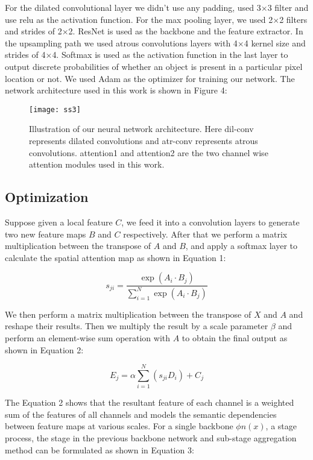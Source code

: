 \documentclass{article}
\begin{document}
For the dilated convolutional layer we didn’t use any padding, used 3$\times$3 filter and use relu as the activation function. For the max pooling layer, we used 2$\times$2 filters and strides of 2$\times$2. ResNet is used as the backbone and the feature extractor. In the upsampling path we used atrous convolutions layers with 4$\times$4 kernel size and strides of 4$\times$4. Softmax is used as the activation function in the last layer to output discrete probabilities of whether an object is present in a particular pixel location or not. We used Adam as the optimizer for training our network. The network architecture used in this work is shown in Figure 4:

\begin{figure}[htp]
    \centering
    \texttt{[image: ss3]}
    \caption{Illustration of our neural network architecture. Here dil-conv represents dilated convolutions and atr-conv represents atrous convolutions. attention1 and attention2 are the two channel wise attention modules used in this work.}
    \label{fig3}
\end{figure}

\subsection{Optimization}

Suppose given a local feature $C$, we feed it into a convolution layers to generate two new feature maps $B$ and $C$ respectively. After that we perform a matrix multiplication between the transpose of $A$ and $B$, and apply a softmax layer to calculate the spatial attention map as shown in Equation 1:

\begin{equation}
s_{j i}=\frac{\exp \left(A_{i} \cdot B_{j}\right)}{\sum_{i=1}^{N} \exp \left(A_{i} \cdot B_{j}\right)}    
\end{equation}

We then perform a matrix multiplication
between the transpose of $X$ and $A$ and reshape their results. Then we multiply the result by a scale parameter $\beta$ and perform an element-wise sum operation with
$A$ to obtain the final output as shown in Equation 2:

\begin{equation}
E_{j}=\alpha \sum_{i=1}^{N}\left(s_{j i} D_{i}\right)+C_{j} 
\end{equation}

The Equation 2 shows that the resultant feature of each channel is a weighted sum of the features of all channels and models the semantic dependencies between feature maps at various scales. For a single backbone $\phi n(x)$, a stage process, the stage in the previous backbone network and sub-stage aggregation method can be formulated as shown in Equation 3: 
\end{document}
